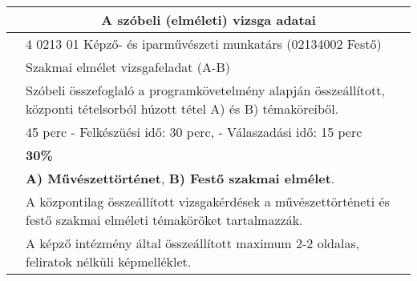 \begin{center}
	\begin{longtable}{ | p{} | p{} | }
		
		\hline
		\multicolumn{2}{|c|}{\textbf{A szóbeli (elméleti) vizsga adatai}}
		\\ \hline
		
		\hline
		\centering{Szakképesítés megnevezése}
		& 
		4 0213 01 Képző- és iparművészeti munkatárs (02134002 Festő)
		\\ \hline
		
		\centering{A vizsgafeladat megnevezése}
		&
		Szakmai elmélet vizsgafeladat (A-B)
		\\\hline
		
		\centering{A vizsgafeladat ismertetése}
		&
		Szóbeli összefoglaló a programkövetelmény alapján összeállított, központi tételsorból húzott tétel A) és B) témaköreiből.
		\\\hline
		
		\centering{Vizsgafeladat időtartama}
		&
		45 perc\newline
		 - Felkészüési idő: 30 perc,\newline
		 - Válaszadási idő: 15 perc
		\\\hline
		
		\centering{A vizsgafeladat értékelési súlyaránya}
		&
		\textbf{30\%}
		\\\hline
		
		\centering{A tételsor a következő tantárgyak témaköreiből kerül összeállításra}
		&
		\textbf{A) Művészettörténet},\newline
		\textbf{B) Festő szakmai elmélet}.
		\\\hline
		
		\centering{Tételek tartalma}
		&
		A központilag összeállított vizsgakérdések a művészettörténeti és festő szakmai elméleti témaköröket tartalmazzák.
		\\\hline
		
		\centering{A tételekhez használható segédeszköz}
		&
		A képző intézmény által összeállított maximum 2-2 oldalas, feliratok nélküli képmelléklet.
		\\\hline		
	\end{longtable}
\end{center}

